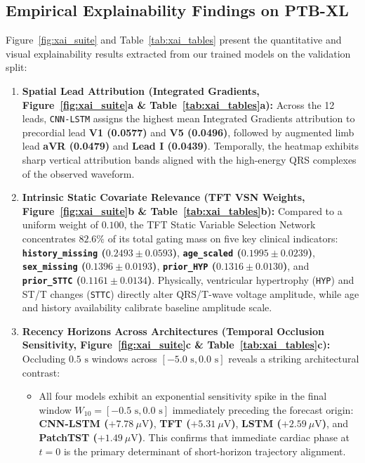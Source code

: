 \documentclass[11pt,a4paper]{article}
\begin{document}
\subsection{Empirical Explainability Findings on PTB-XL}
Figure~\ref{fig:xai_suite} and Table~\ref{tab:xai_tables} present the quantitative and visual explainability results extracted from our trained models on the validation split:
\begin{enumerate}
    \item \textbf{Spatial Lead Attribution (Integrated Gradients, Figure~\ref{fig:xai_suite}a \& Table~\ref{tab:xai_tables}a):} Across the 12 leads, \texttt{CNN-LSTM} assigns the highest mean Integrated Gradients attribution to precordial lead \textbf{V1 (0.0577)} and \textbf{V5 (0.0496)}, followed by augmented limb lead \textbf{aVR (0.0479)} and \textbf{Lead I (0.0439)}. Temporally, the heatmap exhibits sharp vertical attribution bands aligned with the high-energy QRS complexes of the observed waveform.
    \item \textbf{Intrinsic Static Covariate Relevance (TFT VSN Weights, Figure~\ref{fig:xai_suite}b \& Table~\ref{tab:xai_tables}b):} Compared to a uniform weight of $0.100$, the TFT Static Variable Selection Network concentrates $82.6\%$ of its total gating mass on five key clinical indicators: \textbf{\texttt{history\_missing} ($0.2493 \pm 0.0593$)}, \textbf{\texttt{age\_scaled} ($0.1995 \pm 0.0239$)}, \textbf{\texttt{sex\_missing} ($0.1396 \pm 0.0193$)}, \textbf{\texttt{prior\_HYP} ($0.1316 \pm 0.0130$)}, and \textbf{\texttt{prior\_STTC} ($0.1161 \pm 0.0134$)}. Physically, ventricular hypertrophy (\texttt{HYP}) and ST/T changes (\texttt{STTC}) directly alter QRS/T-wave voltage amplitude, while age and history availability calibrate baseline amplitude scale.
    \item \textbf{Recency Horizons Across Architectures (Temporal Occlusion Sensitivity, Figure~\ref{fig:xai_suite}c \& Table~\ref{tab:xai_tables}c):} Occluding $0.5\text{ s}$ windows across $[-5.0\text{ s}, 0.0\text{ s}]$ reveals a striking architectural contrast:
    \begin{itemize}
        \item All four models exhibit an exponential sensitivity spike in the final window $W_{10} = [-0.5\text{ s}, 0.0\text{ s}]$ immediately preceding the forecast origin: \textbf{CNN-LSTM ($+7.78\ \mu\text{V}$)}, \textbf{TFT ($+5.31\ \mu\text{V}$)}, \textbf{LSTM ($+2.59\ \mu\text{V}$)}, and \textbf{PatchTST ($+1.49\ \mu\text{V}$)}. This confirms that immediate cardiac phase at $t = 0$ is the primary determinant of short-horizon trajectory alignment.

\end{itemize}
\end{enumerate}
\end{document}
